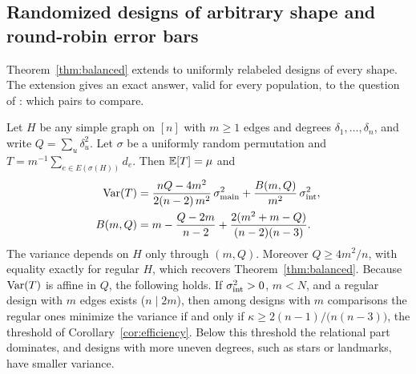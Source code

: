 \subsection{Randomized designs of arbitrary shape and round-robin error bars}
\label{app:general-design}

Theorem~\ref{thm:balanced} extends to uniformly relabeled designs of every shape. The extension gives an
exact answer, valid for every population, to the question of : which pairs to compare.

\begin{theorem}
\label{thm:general-design}
Let $H$ be any simple graph on $[n]$ with $m\ge1$ edges and degrees
$\delta_1,\dots,\delta_n$, and write $Q=\sum_u\delta_u^2$. Let $\sigma$ be a uniformly
random permutation and $T=m^{-1}\sum_{e\in E(\sigma(H))}d_e$. Then $\mathbb{E}[T]=\mu$ and
\begin{align*}
\operatorname{Var}(T)&=\frac{nQ-4m^2}{2(n-2)\,m^2}\,\sigma^2_{\mathrm{main}}+\frac{B(m,Q)}{m^2}\,\sigma^2_{\mathrm{int}},\\
B(m,Q)&=m-\frac{Q-2m}{n-2}+\frac{2(m^2+m-Q)}{(n-2)(n-3)} .
\end{align*}
The variance depends on $H$ only through $(m,Q)$. Moreover $Q\ge4m^2/n$, with
equality exactly for regular $H$, which recovers Theorem~\ref{thm:balanced}.
Because $\operatorname{Var}(T)$ is affine in $Q$, the following holds. If $\sigma^2_{\mathrm{int}}>0$, $m<N$,
and a regular design with $m$ edges exists ($n\mid 2m$), then among designs with
$m$ comparisons the regular ones minimize the variance if and only if
$\kappa\ge 2(n-1)/\bigl(n(n-3)\bigr)$, the threshold of Corollary~\ref{cor:efficiency}.
Below this threshold the relational part dominates, and designs with more
uneven degrees, such as stars or landmarks, have smaller variance.
\end{theorem}

